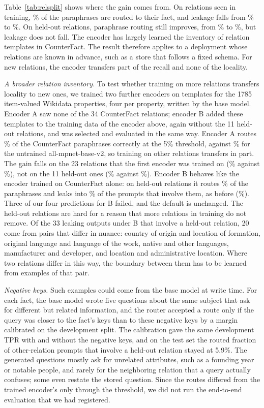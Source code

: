 \documentclass[journal,10pt]{IEEEtran}
\begin{document}
Table~\ref{tab:relsplit} shows where the gain comes from. On relations seen in training,
\xParaSeenRoutePct\% of the paraphrases are routed to their fact, and leakage falls from
\xEthreeSeenDefPct\% to \xEthreeSeenLeakPct\%. On held-out relations, paraphrase routing
still improves, from \xParaHeldDefRoutePct\% to \xParaHeldRoutePct\%, but leakage does
not fall. The encoder has largely learned the inventory of relation templates in
CounterFact. The result therefore applies to a deployment whose relations are known in
advance, such as a store that follows a fixed schema. For new relations, the encoder
transfers part of the recall and none of the locality.

\emph{A broader relation inventory.} To test whether training on more relations transfers
locality to new ones, we trained two further encoders on templates for the 1785
item-valued Wikidata properties, four per property, written by the base model. Encoder
A saw none of the 34 CounterFact relations; encoder B added these templates to the
training data of the encoder above, again without the 11 held-out relations, and was
selected and evaluated in the same way. Encoder A routes \aCfParaRoutePct\% of the
CounterFact paraphrases correctly at the 5\% threshold, against \mpCfParaRoutePct\% for
the untrained all-mpnet-base-v2, so training on other relations transfers in part. The
gain falls on the 23 relations that the first encoder was trained on
(\aParaSeenRoutePct\% against \mpParaSeenRoutePct\%), not on the 11 held-out ones
(\aParaHeldRoutePct\% against \mpParaHeldRoutePct\%). Encoder B behaves like the encoder
trained on CounterFact alone: on held-out relations it routes \uParaHeldRoutePct\% of the
paraphrases and leaks into \uHeldLeakPct\% of the prompts that involve them, as before
(\xHeldLeakPct\%). Three of our four predictions for B failed, and the default is
unchanged. The held-out relations are hard for a reason that more relations in training
do not remove. Of the 33 leaking outputs under B that involve a held-out relation, 20
come from pairs that differ in nuance: country of origin and location of formation,
original language and language of the work, native and other languages, manufacturer and
developer, and location and administrative location. Where two relations differ in this
way, the boundary between them has to be learned from examples of that pair.

\emph{Negative keys.} Such examples could come from the base model at write time. For
each fact, the base model wrote five questions about the same subject that ask for
different but related information, and the router accepted a route only if the query was
closer to the fact's keys than to these negative keys by a margin calibrated on the
development split. The calibration gave the same development TPR with and without the
negative keys, and on the test set the routed fraction of other-relation prompts that
involve a held-out relation stayed at 5.9\%. The generated questions mostly ask for
unrelated attributes, such as a founding year or notable people, and rarely for the
neighboring relation that a query actually confuses; some even restate the stored
question. Since the routes differed from the trained encoder's only through the threshold,
we did not run the end-to-end evaluation that we had registered.
\end{document}
